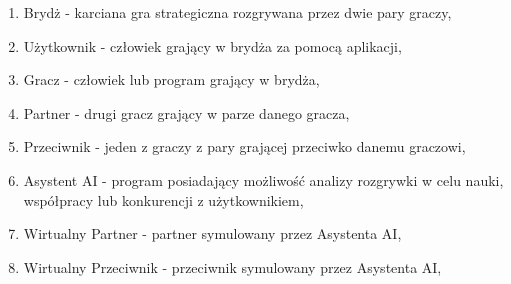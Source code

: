 \begin{enumerate}
  \item Brydż - karciana gra strategiczna rozgrywana przez dwie pary graczy,
  \item Użytkownik - człowiek grający w brydża za pomocą aplikacji,
  \item Gracz - człowiek lub program grający w brydża,
  \item Partner - drugi gracz grający w parze danego gracza,
  \item Przeciwnik - jeden z graczy z pary grającej przeciwko danemu graczowi,
  \item Asystent AI - program posiadający możliwość analizy rozgrywki w celu nauki, współpracy lub konkurencji z użytkownikiem,
  \item Wirtualny Partner - partner symulowany przez Asystenta AI,
  \item Wirtualny Przeciwnik - przeciwnik symulowany przez Asystenta AI,
\end{enumerate}